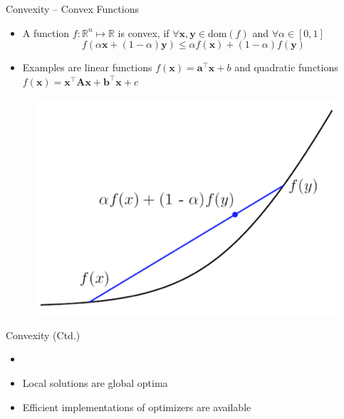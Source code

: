 \begin{frame}{Convexity -- Convex Functions}{}
	\begin{itemize}
		\item A function $f : \mathbb{R}^n \mapsto \mathbb{R}$ is convex, if $\forall \bm{x}, \bm{y} \in \text{dom}(f)$ and $\forall \alpha \in [0,1]$
		\begin{equation}
			f(\alpha \bm{x} + (1 - \alpha) \bm{y}) \le \alpha f(\bm{x}) + (1 - \alpha) f(\bm{y})
		\end{equation}
		\item Examples are linear functions $f(\bm{x}) = \bm{a}^{\intercal} \bm{x} + b$
			and quadratic functions $f(\bm{x}) = \bm{x}^{\intercal} \bm{A} \bm{x} + \bm{b}^{\intercal} \bm{x} + c$
	\end{itemize}

	\vspace*{-3mm}
	\begin{figure}
		\center
		\includegraphics[scale=0.2]{02_math/02_img/convex_function}
	\end{figure}
\end{frame}


\begin{frame}{Convexity (Ctd.)}{}
	\begin{itemize}
		\item {}
		\item Local solutions are global optima
		\item Efficient implementations of optimizers are available
	\end{itemize}
\end{frame}


